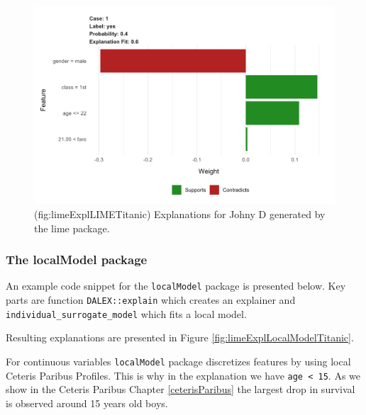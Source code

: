 \documentclass[12pt,]{krantz}
\theoremstyle{definition}
\theoremstyle{definition}
\theoremstyle{definition}
\theoremstyle{remark}
\begin{document}
\begin{figure}

{\centering \includegraphics[width=0.6\linewidth]{figure/lime_expl_lime_titanic} 

}

\caption{(fig:limeExplLIMETitanic) Explanations for Johny D generated by the lime package. }\label{fig:limeExplLIMETitanic}
\end{figure}

\hypertarget{the-localmodel-package}{%
\subsubsection{\texorpdfstring{\textbf{The localModel
package}}{The localModel package}}\label{the-localmodel-package}}

An example code snippet for the \texttt{localModel} package is presented
below. Key parts are function \texttt{DALEX::explain} which creates an
explainer and \texttt{individual\_surrogate\_model} which fits a local
model.

Resulting explanations are presented in Figure
\ref{fig:limeExplLocalModelTitanic}.

For continuous variables \texttt{localModel} package discretizes
features by using local Ceteris Paribus Profiles. This is why in the
explanation we have \texttt{age\ \textless{}\ 15}. As we show in the
Ceteris Paribus Chapter \ref{ceterisParibus} the largest drop in
survival is observed around 15 years old boys.
\end{document}
